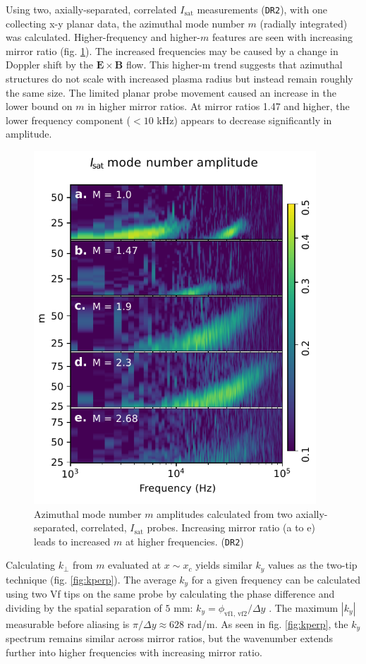 Using two, axially-separated, correlated $I_\text{sat}$ measurements (\texttt{DR2}), with one collecting x-y planar data, the azimuthal mode number $m$ (radially integrated) was calculated. Higher-frequency and higher-$m$ features are seen with increasing mirror ratio (fig. \ref{fig:isat-m-num}). The increased frequencies may be caused by a  change in Doppler shift by the $\boldsymbol{E \times B}$ flow. This higher-m trend suggests that azimuthal structures do not scale with increased plasma radius but instead remain roughly the same size. The limited planar probe movement caused an increase in the lower bound on $m$  in higher mirror ratios. At mirror ratios 1.47 and higher, the lower frequency component ($< 10$ kHz) appears to decrease significantly in amplitude. 
\begin{figure}
    \centering
    \includegraphics[width=300pt]{figures/fig17.pdf}
    \caption[Azimuthal mode number $m$ amplitudes of $I_\text{sat}$ fluctuations]{Azimuthal mode number $m$ amplitudes calculated from two axially-separated, correlated, $I_\text{sat}$ probes. Increasing mirror ratio (a to e) leads to increased $m$ at higher frequencies. (\texttt{DR2})}
    \label{fig:isat-m-num}
\end{figure}
Calculating $k_\perp$ from $m$ evaluated at $x \sim x_c$ yields similar $k_y$ values as the two-tip technique (fig. \ref{fig:kperp}). The average $k_y$ for a given frequency can be calculated using two Vf tips on the same probe by calculating the phase difference and dividing by the spatial separation of $5$ mm: $k_y = \phi_{\text{vf1, vf2}} / \Delta y$ \cite{Powers-twoprobe-ky}. The maximum $|k_y|$ measurable before aliasing is $\pi / \Delta y \approx 628$ rad/m. As seen in fig. \ref{fig:kperp}, the $k_y$ spectrum remains similar across mirror ratios, but the wavenumber extends further into higher frequencies with increasing mirror ratio. 
